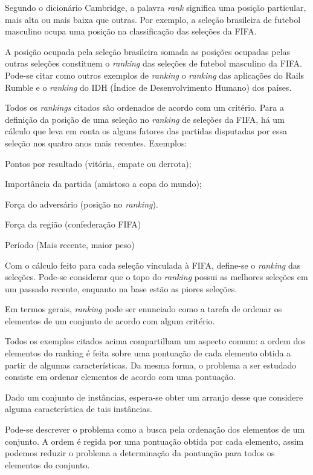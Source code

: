 Segundo o dicionário Cambridge, a palavra \emph{rank} significa uma posição
particular, mais alta ou mais baixa que outras. Por exemplo, a seleção
brasileira de futebol masculino ocupa uma posição na classificação das
seleções da FIFA.

A posição ocupada pela seleção brasileira somada as posições ocupadas pelas
outras seleções constituem o \emph{ranking} das seleções de futebol
masculino da FIFA. Pode-se citar como outros exemplos de \emph{ranking} o
\emph{ranking} das aplicações do Rails Rumble e o \emph{ranking} do IDH
(Índice de Desenvolvimento Humano) dos países.

Todos os \emph{rankings} citados são ordenados de acordo com um critério.
Para a definição da posição de uma seleção no \emph{ranking} de seleções
da FIFA, há um cálculo que leva em conta os alguns fatores das partidas
disputadas por essa seleção nos quatro anos mais recentes. Exemplos:

\begin{list}
    \item Pontos por resultado (vitória, empate ou derrota);
    \item Importância da partida (amistoso a copa do mundo);
    \item Força do adversário (posição no \emph{ranking}).
    \item Força da região (confederação FIFA)
    \item Período (Mais recente, maior peso)
\end{list}

Com o cálculo feito para cada seleção vinculada à FIFA, define-se o
\emph{ranking} das seleções. Pode-se considerar que o topo do \emph{ranking}
possui as melhores seleções em um passado recente, enquanto na base estão
as piores seleções.

Em termos gerais, \emph{ranking} pode ser enunciado como a tarefa de
ordenar os elementos de um conjunto de acordo com algum critério.

Todos os exemplos citados acima compartilham um aspecto comum: a ordem dos
elementos do ranking é feita sobre uma pontuação de cada elemento obtida a
partir de algumas características. Da mesma forma, o problema a ser estudado
consiste em ordenar elementos de acordo com uma pontuação.

Dado um conjunto de instâncias, espera-se obter um arranjo desse que considere
alguma característica de tais instâncias.

Pode-se descrever o problema como a busca pela ordenação dos elementos de um
conjunto. A ordem é regida por uma pontuação obtida por cada elemento, assim
podemos reduzir o problema a determinação da pontuação para todos os
elementos do conjunto.
